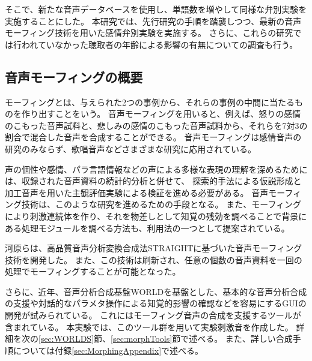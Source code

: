 そこで、新たな音声データベースを使用し、単語数を増やして同様な弁別実験を実施することにした。
本研究では、先行研究\cite{hanatani2023Emo}の手順を踏襲しつつ、最新の音声モーフィング技術\cite{kawahara2024interactive}を用いた感情弁別実験を実施する。
さらに、これらの研究では行われていなかった聴取者の年齢による影響の有無についての調査も行う。



\subsection{音声モーフィングの概要}
\label{sec:morphing}
モーフィングとは、与えられた2つの事例から、それらの事例の中間に当たるものを作り出すことをいう。
音声モーフィングを用いると、例えば、怒りの感情のこもった音声試料と、悲しみの感情のこもった音声試料から、それらを7対3の割合で混合した音声を合成することができる。
音声モーフィングは感情音声の研究のみならず、歌唱音声などさまざまな研究に応用されている\cite{kawahara2009tandem}。

声の個性や感情、パラ言語情報などの声による多様な表現の理解を深めるためには、収録された音声資料の続計的分析と併せて、
探索的手法による仮説形成と加工音声を用いた主観評価実験による検証を進める必要がある。
音声モーフィング技術は、このような研究を進めるための手段となる。
また、モーフィングにより刺激連続体を作り、それを物差しとして知覚の残効を調べることで背景にある処理モジュールを調べる方法も、利用法の一つとして提案されている。

河原らは、高品質音声分析変換合成法STRAIGHT\cite{kawahara1999restructuring}に基づいた音声モーフィング技術を開発した\cite{matsui2003STRAIGHT}。
また、この技術は刷新され、任意の個数の音声資料を一回の処理でモーフィングすることが可能となった\cite{kawahara2013morph,kawahara2014morph}。

さらに、近年、音声分析合成基盤WORLD\cite{morise2016world}を基盤とした、基本的な音声分析合成の支援や対話的なパラメタ操作による知覚的影響の確認などを容易にするGUIの開発が試みられている\cite{kawahara2024interactive}。
これにはモーフィング音声の合成を支援するツールが含まれている。
本実験では、このツール群を用いて実験刺激音を作成した。
詳細を次の\ref{sec:WORLDS}節、\ref{sec:morphTools}節で述べる。
また、詳しい合成手順については付録\ref{sec:MorphingAppendix}で述べる。


\clearpage
